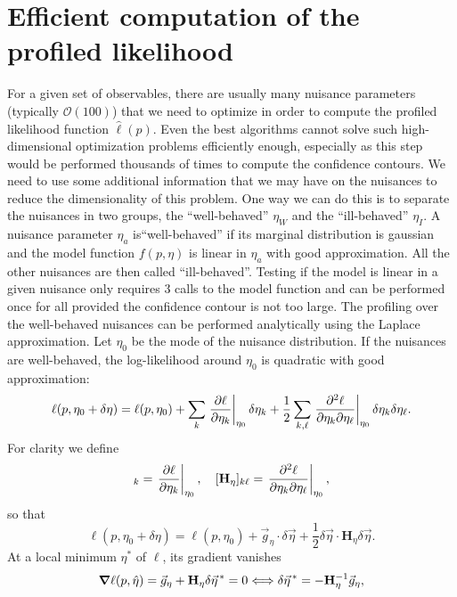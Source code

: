 \documentclass[preprint,11pt]{elsarticle}
\begin{document}
\section{Efficient computation of the profiled likelihood}
For a given set of observables, there are usually many nuisance parameters (typically $\mathcal{O}(100)$) that we need to optimize in order to compute the profiled likelihood function $\hat\ell(p)$. Even the best algorithms cannot solve such high-dimensional optimization problems efficiently enough, especially as this step would be performed thousands of times to compute the confidence contours. We need to use some additional information that we may have on the nuisances to reduce the dimensionality of this problem. One way we can do this is to separate the nuisances in two groups, the ``well-behaved'' $\eta_W$ and the ``ill-behaved'' $\eta_I$. A nuisance parameter $\eta_a$ is``well-behaved'' if its marginal distribution is gaussian and the model function $f(p,\eta)$ is linear in $\eta_a$ with good approximation. All the other nuisances are then called ``ill-behaved''. Testing if the model is linear in a given nuisance only requires 3 calls to the model function and can be performed once for all provided the confidence contour is not too large. \smallbreak
The profiling over the well-behaved nuisances can be performed analytically using the Laplace approximation. Let $\eta_0$ be the mode of the nuisance distribution. If the nuisances are well-behaved, the log-likelihood around $\eta_0$ is quadratic with good approximation:
\begin{equation}
    \ell(p,\eta_0+\delta\eta)=\ell(p,\eta_0)+\sum_k\eval{\pdv{\ell}{\eta_k}}_{\eta_0}\delta\eta_k+\frac{1}{2}\sum_{k,\ell}\eval{\pdv{\ell}{\eta_k}{\eta_\ell}}_{\eta_0}\delta\eta_k\delta\eta_\ell.
\end{equation}
For clarity we define
\begin{equation}
    [\vec g_\eta]_k=\eval{\pdv{\ell}{\eta_k}}_{\eta_0}\qc [\mathbf{H}_\eta]_{k\ell}=\eval{\pdv{\ell}{\eta_k}{\eta_\ell}}_{\eta_0},
\end{equation}
so that
\begin{equation}
    \ell(p,\eta_0+\delta\eta)=\ell(p,\eta_0)+\vec g_\eta\cdot\delta\vec\eta+\frac{1}{2}\delta\vec\eta\cdot\mathbf{H}_\eta\delta\vec\eta.
\end{equation}
At a local minimum $\eta^*$ of $\ell$, its gradient vanishes
\begin{equation}
    \grad\ell(p,\hat\eta)=\vec g_\eta+\mathbf{H}_\eta\delta{\vec\eta}^{\,*}=0\Longleftrightarrow \delta{\vec\eta}^{\,*}=-\mathbf{H}_\eta^{-1}\vec g_\eta,
\end{equation}
\end{document}
